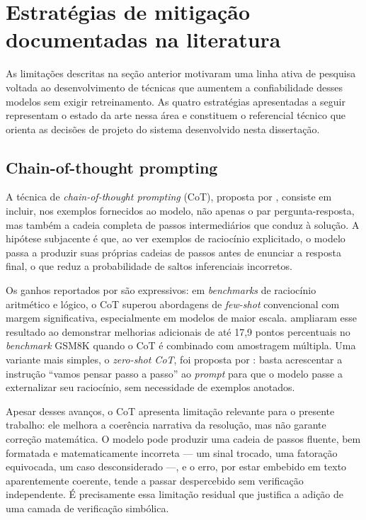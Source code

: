 \section{Estratégias de mitigação documentadas na literatura}
\label{sec:mitigacao}

As limitações descritas na seção anterior motivaram uma linha ativa de pesquisa voltada ao
desenvolvimento de técnicas que aumentem a confiabilidade desses modelos sem exigir retreinamento.
As quatro estratégias apresentadas a seguir representam o estado da arte nessa área e constituem o
referencial técnico que orienta as decisões de projeto do sistema desenvolvido nesta dissertação.

\subsection{Chain-of-thought prompting}
\label{sub:cot}

A técnica de \emph{chain-of-thought prompting} (CoT), proposta por \citet{wei2022chain}, consiste em
incluir, nos exemplos fornecidos ao modelo, não apenas o par pergunta-resposta, mas também a cadeia
completa de passos intermediários que conduz à solução. A hipótese subjacente é que, ao ver exemplos
de raciocínio explicitado, o modelo passa a produzir suas próprias cadeias de passos antes de
enunciar a resposta final, o que reduz a probabilidade de saltos inferenciais incorretos.

Os ganhos reportados por \citet{wei2022chain} são expressivos: em \emph{benchmarks} de raciocínio
aritmético e lógico, o CoT superou abordagens de \emph{few-shot} convencional com margem
significativa, especialmente em modelos de maior escala. \citet{wang2023selfconsistency} ampliaram
esse resultado ao demonstrar melhorias adicionais de até 17,9 pontos percentuais no \emph{benchmark}
GSM8K quando o CoT é combinado com amostragem múltipla. Uma variante mais simples, o \emph{zero-shot
CoT}, foi proposta por \citet{kojima2022zero}: basta acrescentar a instrução ``vamos pensar passo a
passo'' ao \emph{prompt} para que o modelo passe a externalizar seu raciocínio, sem necessidade de
exemplos anotados.

Apesar desses avanços, o CoT apresenta limitação relevante para o presente trabalho: ele melhora a
coerência narrativa da resolução, mas não garante correção matemática. O modelo pode produzir uma
cadeia de passos fluente, bem formatada e matematicamente incorreta --- um sinal trocado, uma
fatoração equivocada, um caso desconsiderado ---, e o erro, por estar embebido em texto
aparentemente coerente, tende a passar despercebido sem verificação independente. É precisamente essa
limitação residual que justifica a adição de uma camada de verificação simbólica.

